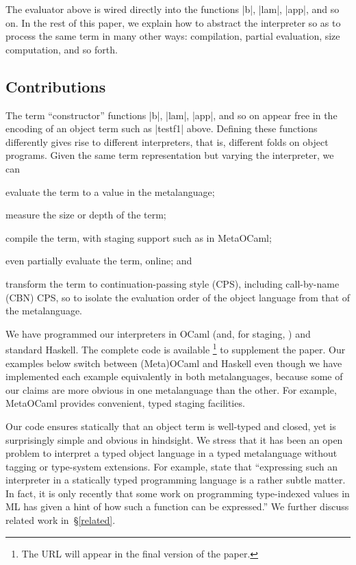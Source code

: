 \documentclass[preprint]{sigplanconf}
\begin{document}
The evaluator above is wired directly into the
functions |b|, |lam|, |app|, and so on.  In the rest of this paper, 
we explain how to abstract the interpreter so as
to process the same term in many other
ways: compilation, partial evaluation, size
computation, and so forth.

\subsection{Contributions}\label{contributions}

The term ``constructor'' functions |b|, |lam|, |app|, and so on appear
free in the encoding of an object term such as |testf1| above.  Defining
these functions differently gives rise to different interpreters, that
is, different folds on object programs.  Given the same term
representation but varying the interpreter, we can
\begin{itemize*}
    \item evaluate the term to a value in the metalanguage;
    \item measure the size or depth of the term;
    \item compile the term, with staging support such as in MetaOCaml;
    \item even partially evaluate the term, online; and
    \item transform the term to continuation\hyp passing style (CPS),
        including call-by-name (CBN) CPS, so to isolate the evaluation
        order of the object language from that of the metalanguage.
\end{itemize*}
We have programmed our interpreters in OCaml (and, for staging,
\citet{metaocaml}) and standard Haskell. The complete code is available%
\footnote{The URL will appear in the final version of the paper.}
to supplement the paper. Our examples below switch between (Meta)OCaml
and Haskell even though we have implemented each example equivalently in
both metalanguages, because some of our claims are more obvious in one
metalanguage than the other.  For example, MetaOCaml provides
convenient, typed staging facilities.

Our code ensures statically that an object term is well-typed and
closed, yet is surprisingly simple and obvious in hindsight.  We stress
that it has been an open problem to
interpret a typed object language in a typed metalanguage without
tagging or type\hyp system extensions.  For example, \citet{taha-tag}
state that ``expressing such an interpreter in a statically typed
programming language is a rather subtle matter. In fact, it is only
recently that some work on programming type-indexed values in ML
\citep{yang-encoding} has given a hint of how such a function can be
expressed.''  We further discuss related work in~\S\ref{related}.
\end{document}

